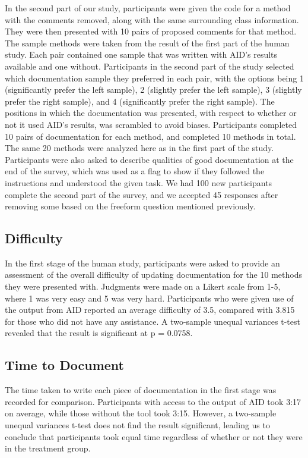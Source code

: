 \documentclass[preprint]{sigplanconf}
\begin{document}
In the second part of our study, participants were given the code for a method with the comments removed, along with the same surrounding class information. They were then presented with 10 pairs of proposed comments for that method. The sample methods were taken from the result of the first part of the human study. Each pair contained one sample that was written with AID's results available and one without. Participants in the second part of the study selected which documentation sample they preferred in each pair, with the options being 1 (significantly prefer the left sample), 2 (slightly prefer the left sample), 3 (slightly prefer the right sample), and 4 (significantly prefer the right sample). The positions in which the documentation was presented, with respect to whether or not it used AID's results, was scrambled to avoid biases. Participants completed 10 pairs of documentation for each method, and completed 10 methods in total. The same 20 methods were analyzed here as in the first part of the study. Participants were also asked to describe qualities of good documentation at the end of the survey, which was used as a flag to show if they followed the instructions and understood the given task. We had 100 new participants complete the second part of the survey, and we accepted 45 responses after removing some based on the freeform question mentioned previously.

\subsection{Difficulty}
In the first stage of the human study, participants were asked to provide an assessment of the overall difficulty of updating documentation for the 10 methods they were presented with. Judgments were made on a Likert scale from 1-5, where 1 was very easy and 5 was very hard. Participants who were given use of the output from AID reported an average difficulty of 3.5, compared with 3.815 for those who did not have any assistance. A two-sample unequal variances t-test revealed that the result is significant at p = 0.0758.

\subsection{Time to Document}
The time taken to write each piece of documentation in the first stage was recorded for comparison. Participants with access to the output of AID took 3:17 on average, while those without the tool took 3:15. However, a two-sample unequal variances t-test does not find the result significant, leading us to conclude that participants took equal time regardless of whether or not they were in the treatment group.
\end{document}
